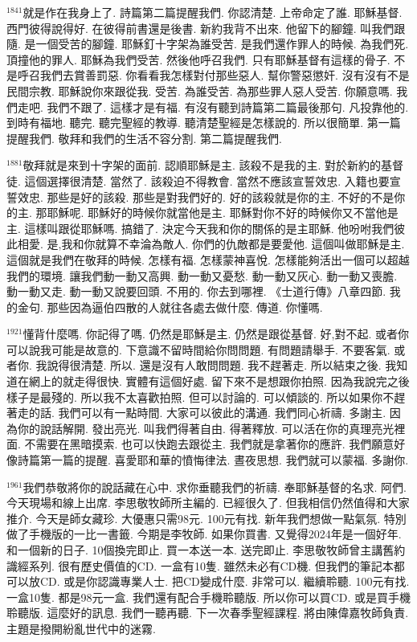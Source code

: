 \documentclass{book}
\begin{document}
$^{1841}$就是作在我身上了.
詩篇第二篇提醒我們.
你認清楚.
上帝命定了誰.
耶穌基督.
西門彼得說得好.
在彼得前書還是後書.
新約我背不出來.
他留下的腳鐘.
叫我們跟隨.
是一個受苦的腳鐘.
耶穌釘十字架為誰受苦.
是我們還作罪人的時候.
為我們死.
頂撞他的罪人.
耶穌為我們受苦.
然後他呼召我們.
只有耶穌基督有這樣的骨子.
不是呼召我們去賞善罰惡.
你看看我怎樣對付那些惡人.
幫你警惡懲奸.
沒有沒有不是民間宗教.
耶穌說你來跟從我.
受苦.
為誰受苦.
為那些罪人惡人受苦.
你願意嗎.
我們走吧.
我們不跟了.
這樣才是有福.
有沒有聽到詩篇第二篇最後那句.
凡投靠他的.
到時有福地.
聽完.
聽完聖經的教導.
聽清楚聖經是怎樣說的.
所以很簡單.
第一篇提醒我們.
敬拜和我們的生活不容分割.
第二篇提醒我們.

$^{1881}$敬拜就是來到十字架的面前.
認順耶穌是主.
該殺不是我的主.
對於新約的基督徒.
這個選擇很清楚.
當然了.
該殺迫不得教會.
當然不應該宣誓效忠.
入籍也要宣誓效忠.
那些是好的該殺.
那些是對我們好的.
好的該殺就是你的主.
不好的不是你的主.
那耶穌呢.
耶穌好的時候你就當他是主.
耶穌對你不好的時候你又不當他是主.
這樣叫跟從耶穌嗎.
搞錯了.
決定今天我和你的關係的是主耶穌.
他吩咐我們彼此相愛.
是,我和你就算不幸淪為敵人.
你們的仇敵都是要愛他.
這個叫做耶穌是主.
這個就是我們在敬拜的時候.
怎樣有福.
怎樣蒙神喜悅.
怎樣能夠活出一個可以超越我們的環境.
讓我們動一動又高興.
動一動又憂愁.
動一動又灰心.
動一動又喪膽.
動一動又走.
動一動又說要回頭.
不用的.
你去到哪裡.
《士道行傳》八章四節.
我的金句.
那些因為逼伯四散的人就往各處去做什麼.
傳道.
你懂嗎.

$^{1921}$懂背什麼嗎.
你記得了嗎.
仍然是耶穌是主.
仍然是跟從基督.
好,對不起.
或者你可以說我可能是故意的.
下意識不留時間給你問問題.
有問題請舉手.
不要客氣.
或者你.
我說得很清楚.
所以.
還是沒有人敢問問題.
我不趕著走.
所以結束之後.
我知道在網上的就走得很快.
實體有這個好處.
留下來不是想跟你拍照.
因為我說完之後樣子是最殘的.
所以我不太喜歡拍照.
但可以討論的.
可以傾談的.
所以如果你不趕著走的話.
我們可以有一點時間.
大家可以彼此的溝通.
我們同心祈禱.
多謝主.
因為你的說話解開.
發出亮光.
叫我們得著自由.
得著釋放.
可以活在你的真理亮光裡面.
不需要在黑暗摸索.
也可以快跑去跟從主.
我們就是拿著你的應許.
我們願意好像詩篇第一篇的提醒.
喜愛耶和華的憤悔律法.
晝夜思想.
我們就可以蒙福.
多謝你.

$^{1961}$我們恭敬將你的說話藏在心中.
求你垂聽我們的祈禱.
奉耶穌基督的名求.
阿們.
今天現場和線上出席.
李思敬牧師所主編的.
已經很久了.
但我相信仍然值得和大家推介.
今天是師女藏珍.
大優惠只需98元.
100元有找.
新年我們想做一點氣氛.
特別做了手機版的一比一書籤.
今期是李牧師.
如果你買書.
又覺得2024年是一個好年.
和一個新的日子.
10個換完即止.
買一本送一本.
送完即止.
李思敬牧師曾主講舊約識經系列.
很有歷史價值的CD.
一盒有10隻.
雖然未必有CD機.
但我們的筆記本都可以放CD.
或是你認識專業人士.
把CD變成什麼.
非常可以.
繼續聆聽.
100元有找.
一盒10隻.
都是98元一盒.
我們還有配合手機聆聽版.
所以你可以買CD.
或是買手機聆聽版.
這麼好的訊息.
我們一聽再聽.
下一次春季聖經課程.
將由陳偉嘉牧師負責.
主題是撥開紛亂世代中的迷霧.
\end{document}
